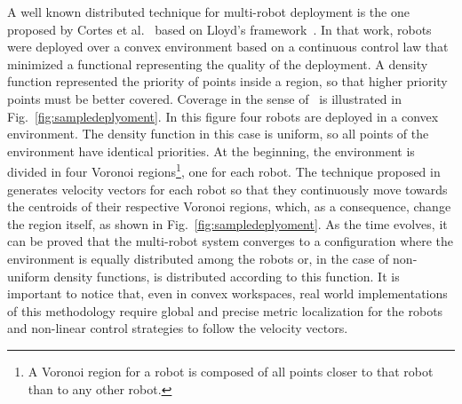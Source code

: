 \documentclass[smallcondensed]{svjour3}
\begin{document}
A well known distributed technique for multi-robot deployment is the one proposed  by Cortes et al.~\cite{Cortes2004} based on Lloyd's framework~\cite{Lloyd1982}. In that work, robots were deployed over a convex environment based on a continuous control law that minimized a functional representing the quality of the deployment. 
%
A density function represented the priority of points inside a region, so that higher priority points must be better covered. Coverage in the sense of~\cite{Cortes2004} is illustrated in Fig.~\ref{fig:sampledeplyoment}. In this figure four robots are deployed in a convex environment. The density function in this case is uniform, so all points of the environment have identical priorities. At the beginning, the environment is divided in four Voronoi regions\footnote{A Voronoi region for a robot is composed of all points closer to that robot than to any other robot.}, one for each robot. The technique proposed in~\cite{Cortes2004} generates velocity vectors for each robot so that they continuously move towards the centroids of their respective Voronoi regions, which, as a consequence, change the region itself, as shown
in Fig.~\ref{fig:sampledeplyoment}. As the time evolves, it can be proved that the multi-robot system converges to a configuration where the environment is equally distributed among the robots or, in the case of non-uniform density functions, is distributed according to this function. It is important to notice that, even in convex workspaces, real world implementations of this methodology require global and precise metric localization for the robots and non-linear control strategies to follow the velocity vectors. 
%
\end{document}
